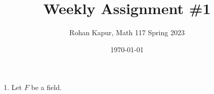 \documentclass[11pt,twoside]{article}
\title{Weekly Assignment \#1}
\author{Rohan Kapur, Math 117 Spring 2023}
\date{\today}
\begin{document}
    \maketitle

    \begin{enumerate}
        \item Let $F$ be a field.
    \end{enumerate}
\end{document}
